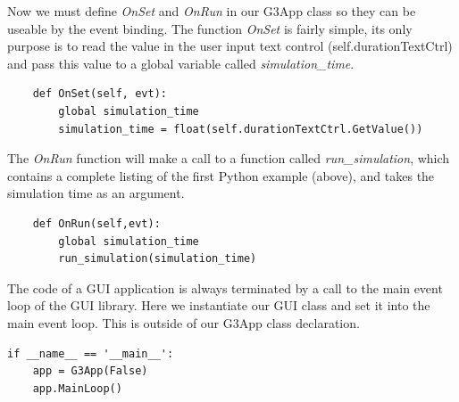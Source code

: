 \documentclass[12pt]{article}
\begin{document}
Now we must define {\it OnSet} and {\it OnRun} in our G3App class so
they can be useable by the event binding. The function {\it OnSet} 
is fairly simple, its only purpose is to read the value in the 
user input text control (self.durationTextCtrl) and pass this value
to a global variable called {\it simulation\_time}.

{\footnotesize
  \resetlinenumber[12]
  \linenumbers
\begin{verbatim}
    def OnSet(self, evt):
        global simulation_time
        simulation_time = float(self.durationTextCtrl.GetValue())
 \end{verbatim}
}

The {\it OnRun} function will make a call to a function called {\it run\_simulation},
which contains a complete listing of the first Python example (above), 
and takes the simulation time as an argument. 


{\footnotesize
  \resetlinenumber[15]
  \linenumbers
\begin{verbatim}
    def OnRun(self,evt):
        global simulation_time
        run_simulation(simulation_time)
\end{verbatim}
}
 

    

The code of a GUI application is always terminated by a call to the
main event loop of the GUI library. Here we instantiate our GUI class
and set it into the main event loop. This is outside of our G3App class
declaration.


 {\footnotesize
   \resetlinenumber[14]
   \linenumbers
 \begin{verbatim}
if __name__ == '__main__':
    app = G3App(False)
    app.MainLoop()
 \end{verbatim}
 }
\end{document}
